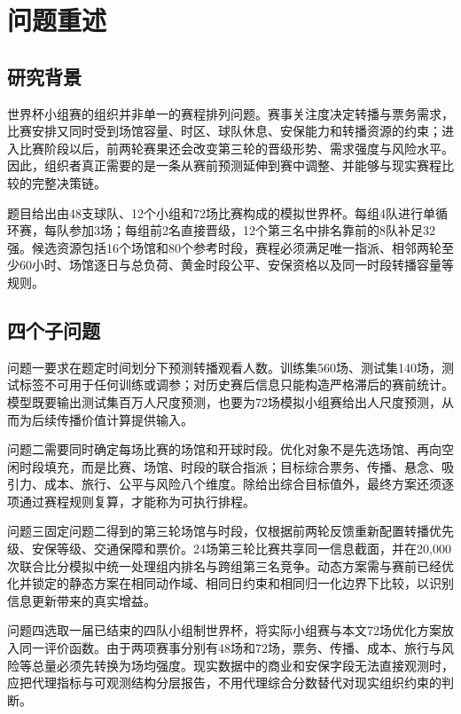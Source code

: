 \section{问题重述}

\subsection{研究背景}

世界杯小组赛的组织并非单一的赛程排列问题。赛事关注度决定转播与票务需求，比赛安排又同时受到场馆容量、时区、球队休息、安保能力和转播资源的约束；进入比赛阶段以后，前两轮赛果还会改变第三轮的晋级形势、需求强度与风险水平。因此，组织者真正需要的是一条从赛前预测延伸到赛中调整、并能够与现实赛程比较的完整决策链。

题目给出由48支球队、12个小组和72场比赛构成的模拟世界杯。每组4队进行单循环赛，每队参加3场；每组前2名直接晋级，12个第三名中排名靠前的8队补足32强。候选资源包括16个场馆和80个参考时段，赛程必须满足唯一指派、相邻两轮至少60小时、场馆逐日与总负荷、黄金时段公平、安保资格以及同一时段转播容量等规则。

\subsection{四个子问题}

问题一要求在题定时间划分下预测转播观看人数。训练集560场、测试集140场，测试标签不可用于任何训练或调参；对历史赛后信息只能构造严格滞后的赛前统计。模型既要输出测试集百万人尺度预测，也要为72场模拟小组赛给出人尺度预测，从而为后续传播价值计算提供输入。

问题二需要同时确定每场比赛的场馆和开球时段。优化对象不是先选场馆、再向空闲时段填充，而是比赛、场馆、时段的联合指派；目标综合票务、传播、悬念、吸引力、成本、旅行、公平与风险八个维度。除给出综合目标值外，最终方案还须逐项通过赛程规则复算，才能称为可执行排程。

问题三固定问题二得到的第三轮场馆与时段，仅根据前两轮反馈重新配置转播优先级、安保等级、交通保障和票价。24场第三轮比赛共享同一信息截面，并在20,000次联合比分模拟中统一处理组内排名与跨组第三名竞争。动态方案需与赛前已经优化并锁定的静态方案在相同动作域、相同日约束和相同归一化边界下比较，以识别信息更新带来的真实增益。

问题四选取一届已结束的四队小组制世界杯，将实际小组赛与本文72场优化方案放入同一评价函数。由于两项赛事分别有48场和72场，票务、传播、成本、旅行与风险等总量必须先转换为场均强度。现实数据中的商业和安保字段无法直接观测时，应把代理指标与可观测结构分层报告，不用代理综合分数替代对现实组织约束的判断。


